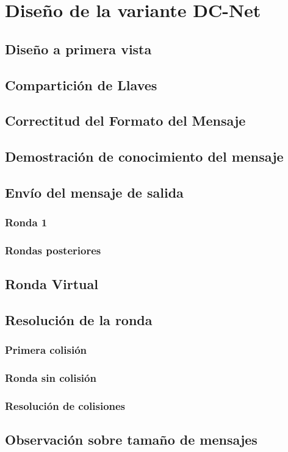 \chapter{Diseño de la variante DC-Net}
\section{Diseño a primera vista}
\section{Compartición de Llaves}
\section{Correctitud del Formato del Mensaje}
\section{Demostración de conocimiento del mensaje}
\section{Envío del mensaje de salida}
\subsection{Ronda 1}
\subsection{Rondas posteriores}
\section{Ronda Virtual}
\section{Resolución de la ronda}
\subsection{Primera colisión}
\subsection{Ronda sin colisión}
\subsection{Resolución de colisiones}
\section{Observación sobre tamaño de mensajes}